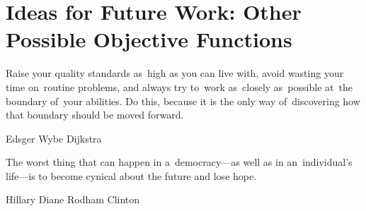 \chapter{Ideas for Future Work: Other Possible Objective Functions}
\epigraph{
  Raise your quality standards as~high as you can live with, avoid wasting your time on~routine problems, and always try to~work as~closely as~possible at~the boundary of~your abilities.
  Do this, because it is the only way of~discovering how that boundary should be moved forward.
}{Edsger Wybe Dijkstra}
\epigraph{
  The worst thing that can happen in a~democracy---as well as in an~individual's life---is to become cynical about the future and lose hope.
}{Hillary Diane Rodham Clinton}
